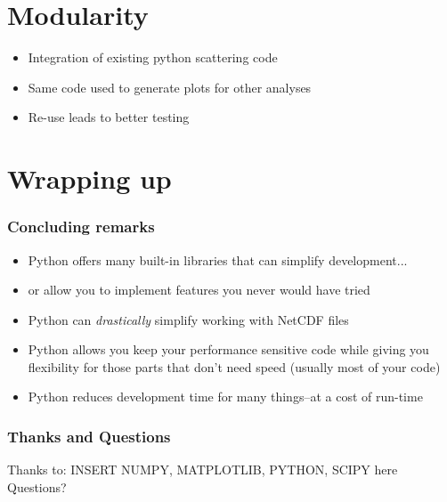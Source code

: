 \documentclass[red, hyperref={pdfpagelabels=false}]{beamer}
\begin{document}
\section{Modularity}

\begin{frame}
  \begin{itemize}
    \item Integration of existing python scattering code
    \item Same code used to generate plots for other analyses
    \item Re-use leads to better testing
  \end{itemize}
\end{frame}

\section{Wrapping up}

\begin{frame}
  \frametitle{Concluding remarks}
  \begin{itemize}
    \item Python offers many built-in libraries that can simplify development...
    \item or allow you to implement features you never would have tried
    \item Python can \emph{drastically} simplify working with NetCDF files
    \item Python allows you keep your performance sensitive code while giving you
      flexibility for those parts that don't need speed (usually most of your code)
    \item Python reduces development time for many things--at a cost of run-time
  \end{itemize}
\end{frame}

\begin{frame}
  \frametitle{Thanks and Questions}
  Thanks to:
  INSERT NUMPY, MATPLOTLIB, PYTHON, SCIPY here
  Questions?
\end{frame}
\end{document}
